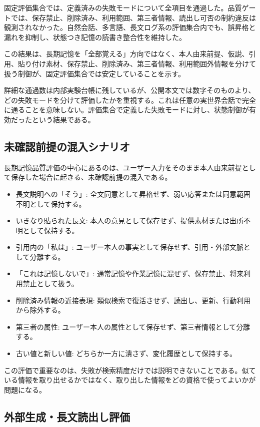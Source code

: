 \documentclass[12pt,a4paper]{article}
\begin{document}
固定評価集合では、定義済みの失敗モードについて全項目を通過した。品質ゲートでは、保存禁止、削除済み、利用範囲、第三者情報、読出し可否の制約違反は観測されなかった。自然会話、多言語、長文ログ系の評価集合内でも、誤昇格と漏れを抑制し、状態つき記憶の読書き整合性を維持した。

この結果は、長期記憶を「全部覚える」方向ではなく、本人由来前提、仮説、引用、貼り付け素材、保存禁止、削除済み、第三者情報、利用範囲外情報を分けて扱う制御が、固定評価集合では安定していることを示す。

詳細な通過数は内部実験台帳に残しているが、公開本文では数字そのものより、どの失敗モードを分けて評価したかを重視する。これは任意の実世界会話で完全に通ることを意味しない。評価集合で定義した失敗モードに対し、状態制御が有効だったという結果である。

\subsection{未確認前提の混入シナリオ}\label{ux672aux78baux8a8dux524dux63d0ux306eux6df7ux5165ux30b7ux30caux30eaux30aa}

長期記憶品質評価の中心にあるのは、ユーザー入力をそのまま本人由来前提として保存した場合に起きる、未確認前提の混入である。

\begin{itemize}
\tightlist
\item
  長文説明への「そう」: 全文同意として昇格せず、弱い応答または同意範囲不明として保持する。
\item
  いきなり貼られた長文: 本人の意見として保存せず、提供素材または出所不明として保持する。
\item
  引用内の「私は」: ユーザー本人の事実として保存せず、引用・外部文脈として分離する。
\item
  「これは記憶しないで」: 通常記憶や作業記憶に混ぜず、保存禁止、将来利用禁止として扱う。
\item
  削除済み情報の近接表現: 類似検索で復活させず、読出し、更新、行動利用から除外する。
\item
  第三者の属性: ユーザー本人の属性として保存せず、第三者情報として分離する。
\item
  古い値と新しい値: どちらか一方に潰さず、変化履歴として保持する。
\end{itemize}

この評価で重要なのは、失敗が検索精度だけでは説明できないことである。似ている情報を取り出せるかではなく、取り出した情報をどの資格で使ってよいかが問題になる。

\subsection{外部生成・長文読出し評価}\label{ux5916ux90e8ux751fux6210ux9577ux6587ux8aadux51faux3057ux8a55ux4fa1}
\end{document}
